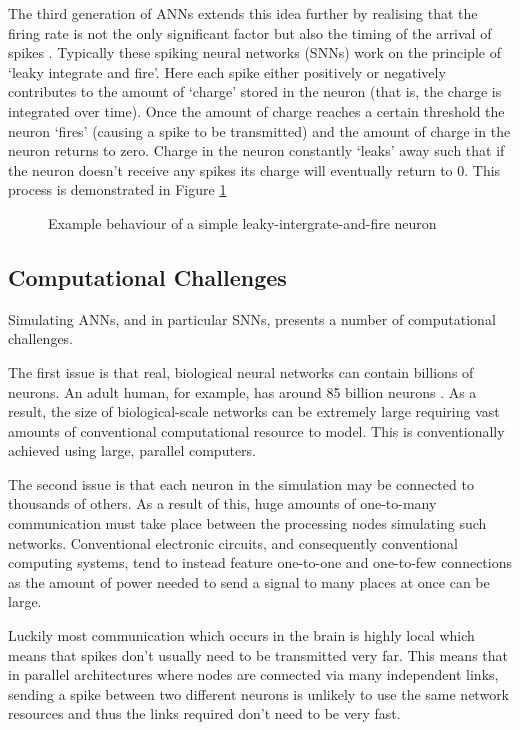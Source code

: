 			The third generation of ANNs extends this idea further by realising that
			the firing rate is not the only significant factor but also the timing of
			the arrival of spikes \cite{maass01}. Typically these spiking neural
			networks (SNNs) work on the principle of `leaky integrate and fire'. Here
			each spike either positively or negatively contributes to the amount of
			`charge' stored in the neuron (that is, the charge is integrated over
			time). Once the amount of charge reaches a certain threshold the neuron
			`fires' (causing a spike to be transmitted) and the amount of charge in
			the neuron returns to zero. Charge in the neuron constantly `leaks' away
			such that if the neuron doesn't receive any spikes its charge will
			eventually return to 0. This process is demonstrated in Figure
			\ref{fig:snn-example}
			
			\begin{figure}
				\center
				
				\caption{Example behaviour of a simple leaky-intergrate-and-fire neuron}
				\label{fig:snn-example}
			\end{figure}
		
		\subsection{Computational Challenges}
			
			Simulating ANNs, and in particular SNNs, presents a number of
			computational challenges.
			
			The first issue is that real, biological neural networks can contain
			billions of neurons. An adult human, for example, has around 85 billion
			neurons \cite{herculano09}. As a result, the size of biological-scale
			networks can be extremely large requiring vast amounts of conventional
			computational resource to model. This is conventionally achieved using
			large, parallel computers.
			
			The second issue is that each neuron in the simulation may be connected to
			thousands of others. As a result of this, huge amounts of one-to-many
			communication must take place between the processing nodes simulating such
			networks. Conventional electronic circuits, and consequently conventional
			computing systems, tend to instead feature one-to-one and one-to-few
			connections as the amount of power needed to send a signal to many places
			at once can be large.
			
			Luckily most communication which occurs in the brain is highly local which
			means that spikes don't usually need to be transmitted very far. This
			means that in parallel architectures where nodes are connected via many
			independent links, sending a spike between two different neurons is
			unlikely to use the same network resources and thus the links required
			don't need to be very fast.
			
